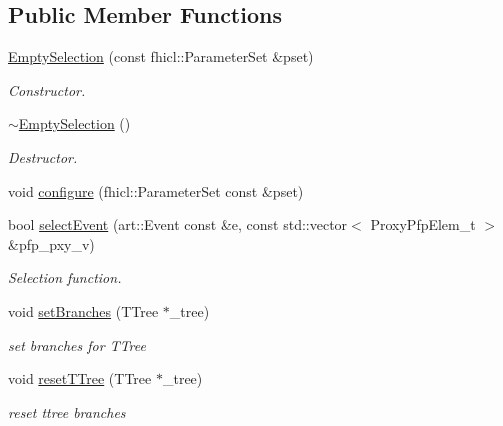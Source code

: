 \subsection*{Public Member Functions}
\begin{DoxyCompactItemize}
\item 
\hyperlink{classselection_1_1EmptySelection_a48affb4fc3524bf814304b3f439900fd}{Empty\+Selection} (const fhicl\+::\+Parameter\+Set \&pset)
\begin{DoxyCompactList}\small\item\em Constructor. \end{DoxyCompactList}\item 
\hyperlink{classselection_1_1EmptySelection_a62d52a58d6da0c8ae7723a405848bd5d}{$\sim$\+Empty\+Selection} ()\hypertarget{classselection_1_1EmptySelection_a62d52a58d6da0c8ae7723a405848bd5d}{}\label{classselection_1_1EmptySelection_a62d52a58d6da0c8ae7723a405848bd5d}

\begin{DoxyCompactList}\small\item\em Destructor. \end{DoxyCompactList}\item 
void \hyperlink{classselection_1_1EmptySelection_a065017fd69d7b8708752bfb1de50fcdc}{configure} (fhicl\+::\+Parameter\+Set const \&pset)
\item 
bool \hyperlink{classselection_1_1EmptySelection_a4ecce282e53d9d7c6c4764eef0b808f7}{select\+Event} (art\+::\+Event const \&e, const std\+::vector$<$ Proxy\+Pfp\+Elem\+\_\+t $>$ \&pfp\+\_\+pxy\+\_\+v)
\begin{DoxyCompactList}\small\item\em Selection function. \end{DoxyCompactList}\item 
void \hyperlink{classselection_1_1EmptySelection_a5045b1b4c68a112effabf710714a2ea2}{set\+Branches} (T\+Tree $\ast$\+\_\+tree)\hypertarget{classselection_1_1EmptySelection_a5045b1b4c68a112effabf710714a2ea2}{}\label{classselection_1_1EmptySelection_a5045b1b4c68a112effabf710714a2ea2}

\begin{DoxyCompactList}\small\item\em set branches for T\+Tree \end{DoxyCompactList}\item 
void \hyperlink{classselection_1_1EmptySelection_aa1e91be25d006a7ff65765419a0667ea}{reset\+T\+Tree} (T\+Tree $\ast$\+\_\+tree)\hypertarget{classselection_1_1EmptySelection_aa1e91be25d006a7ff65765419a0667ea}{}\label{classselection_1_1EmptySelection_aa1e91be25d006a7ff65765419a0667ea}

\begin{DoxyCompactList}\small\item\em reset ttree branches \end{DoxyCompactList}\end{DoxyCompactItemize}
